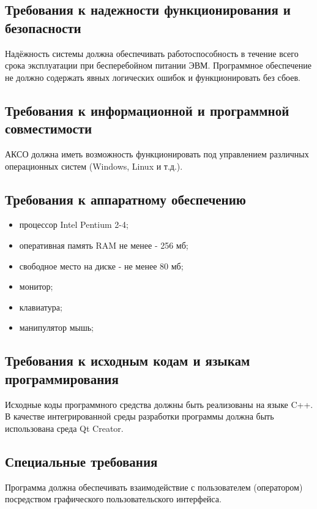 	\subsection{Требования к надежности функционирования и безопасности}
	
	Надёжность системы должна обеспечивать работоспособность в течение всего срока эксплуатации при бесперебойном питании ЭВМ. Программное обеспечение не должно содержать явных логических ошибок и функционировать без сбоев.	
	
	\subsection{Требования к информационной и программной совместимости}
	
	АКСО должна иметь возможность функционировать под управлением различных операционных систем (Windows, Linux и т.д.).
	
	\subsection{Требования к аппаратному обеспечению}
	
	\begin{itemize}
		\item процессор Intel Pentium 2-4;
		\item оперативная память RAM не менее - 256 мб;
		\item свободное место на диске - не менее 80 мб;
		\item монитор;
		\item клавиатура;
		\item манипулятор мышь;
		
	\end{itemize}
	
	\subsection{Требования к исходным кодам и языкам программирования}
	
	Исходные коды программного средства должны быть реализованы на языке C++. В качестве интегрированной среды разработки программы должна быть использована среда Qt Creator.
	
	\subsection{Специальные требования}

	Программа должна обеспечивать взаимодействие с пользователем (оператором) посредством графического пользовательского интерфейса.
	
